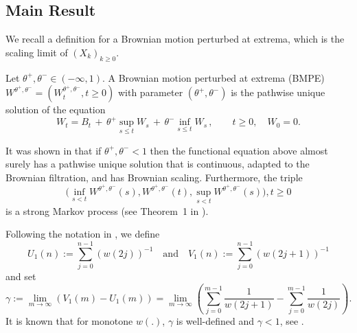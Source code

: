 \documentclass[EJP]{ejpecp} %
\begin{document}




\subsection{Main Result}
We recall a definition for a Brownian motion perturbed at extrema, which is the scaling limit of $(X_k)_{k\geq 0}$.
\begin{definition}
	\label{defn:BMPE}
	Let $\theta^+, \theta^- \in (- \infty , 1)$. A Brownian motion perturbed at
	extrema (BMPE) $W^{\theta^+, \theta^-} = \left(W^{\theta^+, \theta^-}_t, t\geq 0\right)$ with parameter $(\theta^+, \theta^-)$ is the pathwise unique solution of the equation
	$$
	W_t = B_t \,+\, \theta^+ \sup_{s\leq t} W_s  \,+\, \theta^- \inf_{s\leq t} W_s \,,   \qquad t \ge 0, \quad W_0 = 0.
	$$
\end{definition}
It was shown in \cite{PW97, CD99} that if $\theta^+, \theta^- < 1$ then the functional equation above almost surely has a pathwise unique solution that is continuous, adapted to the Brownian filtration, and has Brownian scaling. 
Furthermore, the triple 
$${\big(\inf_{s < t} W^{\theta^{+}, \theta^{-}}(s), 
	W^{\theta^{+}, \theta^{-}}(t) , 
	\sup _{s<t} W^{\theta^{+}, \theta^{-}}(s)\big)}, t \geq 0$$ is a strong Markov process (see Theorem~1 in \cite{PW97}).

Following the notation in \cite{T96}, we define
\[
U_1(n):=\sum_{j=0}^{n-1}(w(2 j))^{-1} \quad \text{and} \quad
V_1(n):=\sum_{j=0}^{n-1}(w(2 j+1))^{-1}
\]
and set
\begin{equation}
	\label{eq: gamma}
	\gamma:= \lim_{m\to \infty}\left( V_1(m) - U_1(m) \right) =\lim_{m\to \infty} \left( \sum_{j=0}^{m-1} \frac{1}{ w(2j+1)}-  \sum_{j=0}^{m-1}  \frac{1}{w(2j)} \right) 
	.\end{equation}
It is known that for monotone $w(.)$, $\gamma$
is well-defined and ${\gamma<1}$, see \cite{T96}. 
\end{document}
